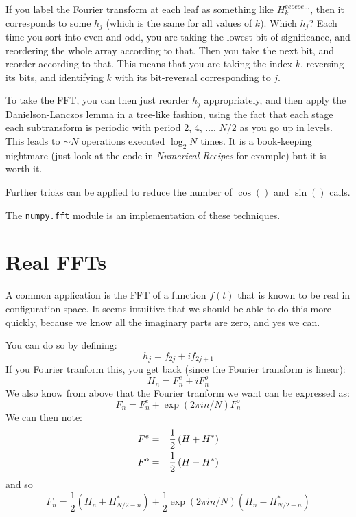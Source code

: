 If you label the Fourier transform at each leaf as something like
$H_k^{eeoeoe\ldots}$, then it corresponds to some $h_j$ (which is the
same for all values of $k$). Which $h_j$?  Each time you sort into
even and odd, you are taking the lowest bit of significance, and
reordering the whole array according to that. Then you take the next
bit, and reorder according to that. This means that you are taking the
index $k$, reversing its bits, and identifying $k$ with its
bit-reversal corresponding to $j$.

To take the FFT, you can then just reorder $h_j$ appropriately, and
then apply the Danielson-Lanczos lemma in a tree-like fashion, using
the fact that each stage each subtransform is periodic with period 2,
4, $\ldots$, $N/2$ as you go up in levels.  This leads to $\sim N$
operations executed $\log_2 N$ times. It is a book-keeping nightmare
(just look at the code in {\it Numerical Recipes} for example) but it
is worth it.

Further tricks can be applied to reduce the number of $\cos()$ and
$\sin()$ calls.

The {\tt numpy.fft} module is an implementation of these techniques.

\section{Real FFTs}

A common application is the FFT of a function $f(t)$ that is known to
be real in configuration space. It seems intuitive that we should be
able to do this more quickly, because we know all the imaginary parts
are zero, and yes we can.

You can do so by defining:
\begin{equation}
h_j = f_{2j} + i f_{2j+1} 
\end{equation}
If you Fourier tranform this, you get back (since the Fourier
transform is linear):
\begin{equation}
H_n = F_n^e + i F_n^o
\end{equation}
We also know from above that the Fourier tranform we want can be
expressed as:
\begin{equation}
F_n = F_n^e + \exp(2\pi i n /N) F_n^o
\end{equation}
We can then note:
\begin{eqnarray}
F^e &=& \frac{1}{2} \left(H + H^\ast\right) \cr
F^o &=& \frac{1}{2} \left(H - H^\ast\right)
\end{eqnarray}
and so
\begin{equation}
  F_n = \frac{1}{2}\left(H_n + H_{N/2-n}^\ast\right) +
  \frac{1}{2} \exp(2\pi i n /N) \left(H_n - H_{N/2-n}^\ast\right)
\end{equation}

